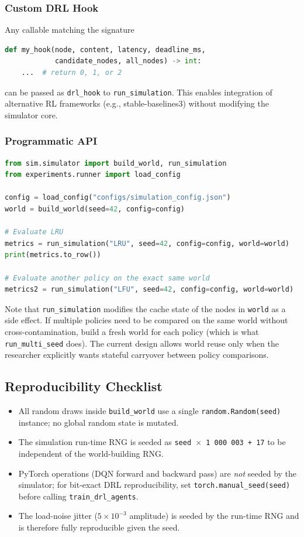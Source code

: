\documentclass[12pt]{article}
\begin{document}
\subsubsection{Custom DRL Hook}

Any callable matching the signature
\begin{lstlisting}[language=Python]
def my_hook(node, content, latency, deadline_ms,
            candidate_nodes, all_nodes) -> int:
    ...  # return 0, 1, or 2
\end{lstlisting}
can be passed as \texttt{drl\_hook} to \texttt{run\_simulation}. This enables integration of alternative RL frameworks (e.g., stable-baselines3) without modifying the simulator core.

\subsubsection{Programmatic API}

\begin{lstlisting}[language=Python]
from sim.simulator import build_world, run_simulation
from experiments.runner import load_config

config = load_config("configs/simulation_config.json")
world = build_world(seed=42, config=config)

# Evaluate LRU
metrics = run_simulation("LRU", seed=42, config=config, world=world)
print(metrics.to_row())

# Evaluate another policy on the exact same world
metrics2 = run_simulation("LFU", seed=42, config=config, world=world)
\end{lstlisting}

Note that \texttt{run\_simulation} modifies the cache state of the nodes in \texttt{world} as a side effect. If multiple policies need to be compared on the same world without cross-contamination, build a fresh world for each policy (which is what \texttt{run\_multi\_seed} does). The current design allows world reuse only when the researcher explicitly wants stateful carryover between policy comparisons.

\subsection{Reproducibility Checklist}

\begin{itemize}[noitemsep]
  \item All random draws inside \texttt{build\_world} use a single \texttt{random.Random(seed)} instance; no global random state is mutated.
  \item The simulation run-time RNG is seeded as \texttt{seed $\times$ 1\,000\,003 + 17} to be independent of the world-building RNG.
  \item PyTorch operations (DQN forward and backward pass) are \emph{not} seeded by the simulator; for bit-exact DRL reproducibility, set \texttt{torch.manual\_seed(seed)} before calling \texttt{train\_drl\_agents}.
  \item The load-noise jitter ($5 \times 10^{-3}$ amplitude) is seeded by the run-time RNG and is therefore fully reproducible given the seed.
\end{itemize}
\end{document}
